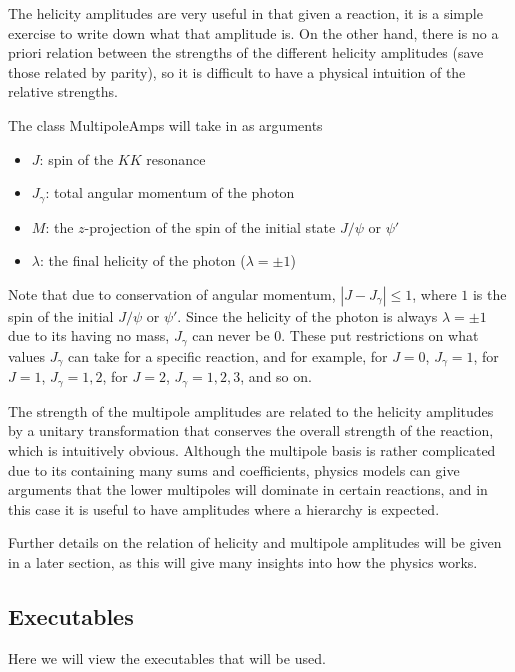 \documentclass[11pt]{article}
\begin{document}
\begin{itemize}
The helicity amplitudes are very useful in that given a reaction, it
is a simple exercise to write down what that amplitude is. On the
other hand, there is no a priori relation between the strengths of the
different helicity amplitudes (save those related by parity), so it is
difficult to have a physical intuition of the relative strengths.

The class MultipoleAmps will take in as arguments
\begin{itemize}
\item $J$: spin of the $KK$ resonance
\item $J_{\gamma}$: total angular momentum of the photon
\item $M$: the $z$-projection of the spin of the initial state
  $J/\psi$ or $\psi'$
\item $\lambda$: the final helicity of the photon ($\lambda = \pm 1$)
\end{itemize}

Note that due to conservation of angular momentum, $|J - J_{\gamma}|
\leq 1$, where $1$ is the spin of the initial $J/\psi$ or
$\psi'$. Since the helicity of the photon is always $\lambda = \pm 1$
due to its having no mass, $J_{\gamma}$ can never be $0$. These put
restrictions on what values $J_{\gamma}$ can take for a specific
reaction, and for example, for $J=0$, $J_{\gamma} = 1$, for $J=1$,
$J_{\gamma} = 1, 2$, for $J=2$, $J_{\gamma} = 1, 2, 3$, and so on.

The strength of the multipole amplitudes are related to the helicity
amplitudes by a unitary transformation that conserves the overall
strength of the reaction, which is intuitively obvious. Although the
multipole basis is rather complicated due to its containing many sums
and coefficients, physics models can give arguments that the lower
multipoles will dominate in certain reactions, and in this case it is
useful to have amplitudes where a hierarchy is expected.

Further details on the relation of helicity and multipole amplitudes
will be given in a later section, as this will give many insights into
how the physics works.

\end{itemize}

\subsection{Executables}
Here we will view the executables that will be used.
\end{document}
